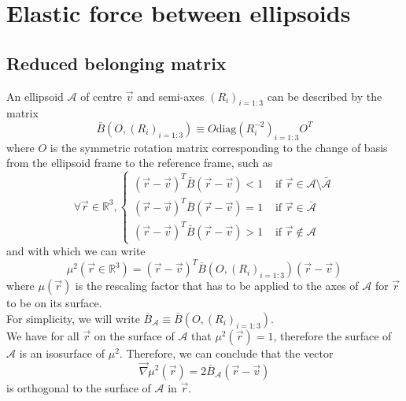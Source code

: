 \documentclass[class=report, float=false, crop=false]{standalone}
\begin{document}
\chapter{Elastic force between ellipsoids}
\label{appendix:force}

\section{Reduced belonging matrix}

An ellipsoid $\mathcal{A}$ of centre $\vec{v}$ and semi-axes $(R_i)_{i=1:3}$ can be described by the matrix
\begin{equation}
\bar{B}(O,(R_i)_{i=1:3}) \equiv O \text{diag}(R_i^{-2})_{i=1:3} O^T
\end{equation}
where $O$ is the symmetric rotation matrix corresponding to the change of basis from the ellipsoid frame to the reference frame, such as
\begin{equation}
\forall \vec{r} \in \mathbb{R}^3, \begin{cases} (\vec{r} - \vec{v})^T \bar{B} (\vec{r} - \vec{v}) < 1 &\text{ if } \vec{r} \in \mathcal{A} \setminus \bar{\mathcal{A}} \\ (\vec{r} - \vec{v})^T \bar{B} (\vec{r} - \vec{v}) = 1 &\text{ if } \vec{r} \in \bar{\mathcal{A}} \\ (\vec{r} - \vec{v})^T \bar{B} (\vec{r} - \vec{v}) > 1 &\text{ if } \vec{r} \notin \mathcal{A} \end{cases}
\end{equation}
and with which we can write
\begin{equation}
\mu^2(\vec{r}\in\mathbb{R}^3) = (\vec{r}-\vec{v})^T\bar{B}(O,(R_i)_{i=1:3})(\vec{r}-\vec{v})
\label{rescaling_factor_squared}
\end{equation}
where $\mu(\vec{r})$ is the rescaling factor that has to be applied to the axes of $\mathcal{A}$ for $\vec{r}$ to be on its surface.\\

For simplicity, we will write $\bar{B}_{\mathcal{A}} \equiv \bar{B}(O,(R_i)_{i=1:3})$.\\

We have for all $\vec{r}$ on the surface of $\mathcal{A}$ that $\mu^2(\vec{r})=1$, therefore the surface of $\mathcal{A}$ is an isosurface of $\mu^2$. Therefore, we can conclude that the vector
\begin{equation}
\vec{\nabla}\mu^2(\vec{r}) = 2\bar{B}_{\mathcal{A}}(\vec{r}-\vec{v})
\end{equation}
is orthogonal to the surface of $\mathcal{A}$ in $\vec{r}$.
\end{document}
